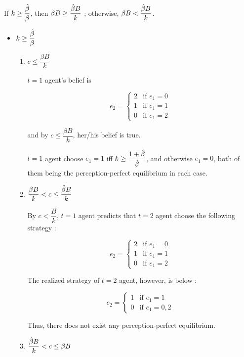\documentclass{jsarticle}
\begin{document}
\begin{enumerate}
\begin{enumerate}
\begin{center}
\end{center}

\vspace{1zw}

If $k \geq \dfrac{\Hat{\beta}}{\beta}$, then $\beta B \geq \dfrac{\Hat{\beta}B}{k}$ ; otherwise, $\beta B < \dfrac{\Hat{\beta}B}{k}$.

 \begin{itemize}
 
 \item $k \geq \dfrac{\Hat{\beta}}{\beta}$
 
  \begin{enumerate}
  
  \item $c \leq \dfrac{\beta B}{k}$
  
 $t=1$ agent's belief is
 
 \[e_2 = \begin{cases}
 2 & \text{if } e_1=0 \\
 1 & \text{if } e_1=1 \\
 0 & \text{if } e_1=2
 \end{cases} \]
 
 and by $c \leq \dfrac{\beta B}{k}$, her/his belief is true.
 
 $t=1$ agent choose $e_1=1$ iff $ k \geq \dfrac{1+\Hat{\beta}}{\Hat{\beta}}$, and otherwise $e_1=0$, both of them being the perception-perfect equilibrium in each case.
  
  \item $\dfrac{\beta B}{k} < c \leq \dfrac{\Hat{\beta}B}{k}$
  
  By $c < \dfrac{B}{k}$, $t=1$ agent predicts that $t=2$ agent choose the following strategy :
 
 \[e_2 = \begin{cases}
 2 & \text{if } e_1=0 \\
 1 & \text{if } e_1=1 \\
 0 & \text{if } e_1=2
 \end{cases} \]
 
 The realized strategy of $t=2$ agent, however, is below :
 
 \[e_2 = \begin{cases}
  1 & \text{if } e_1=1 \\
 0 & \text{if } e_1=0,2
 \end{cases} \]
 
 Thus, there does not exist any perception-perfect equilibrium.
   
  \item $\dfrac{\Hat{\beta }B}{k} < c \leq \beta B$
  

\end{enumerate}
\end{itemize}
\end{enumerate}
\end{enumerate}
\end{document}
